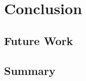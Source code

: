 \chapter{Conclusion} \label{chap:conclusion}

\section{Future Work} \label{sec:future}

\section{Summary} \label{sec:summary}
